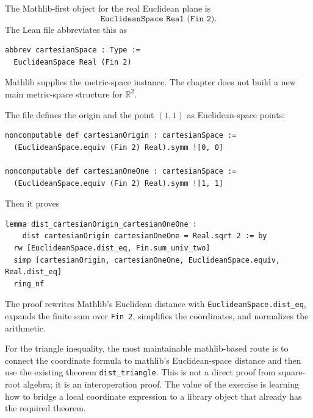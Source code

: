 \begin{example*}
The Mathlib-first object for the real Euclidean plane is
\[
  \texttt{EuclideanSpace Real (Fin 2)}.
\]
The Lean file abbreviates this as
\begin{verbatim}
abbrev cartesianSpace : Type :=
  EuclideanSpace Real (Fin 2)
\end{verbatim}
Mathlib supplies the metric-space instance. The chapter does not build a new
main metric-space structure for \(\mathbb{R}^2\).
\end{example*}

\begin{example*}
The file defines the origin and the point \((1,1)\) as Euclidean-space points:
\begin{verbatim}
noncomputable def cartesianOrigin : cartesianSpace :=
  (EuclideanSpace.equiv (Fin 2) Real).symm ![0, 0]

noncomputable def cartesianOneOne : cartesianSpace :=
  (EuclideanSpace.equiv (Fin 2) Real).symm ![1, 1]
\end{verbatim}
Then it proves
\begin{verbatim}
lemma dist_cartesianOrigin_cartesianOneOne :
    dist cartesianOrigin cartesianOneOne = Real.sqrt 2 := by
  rw [EuclideanSpace.dist_eq, Fin.sum_univ_two]
  simp [cartesianOrigin, cartesianOneOne, EuclideanSpace.equiv, Real.dist_eq]
  ring_nf
\end{verbatim}
The proof rewrites Mathlib's Euclidean distance with
\texttt{EuclideanSpace.dist\_eq}, expands the finite sum over
\texttt{Fin 2}, simplifies the coordinates, and normalizes the arithmetic.
\end{example*}

\begin{remark*}
For the triangle inequality, the most maintainable mathlib-based route is to
connect the coordinate formula to mathlib's Euclidean-space distance and then
use the existing theorem \texttt{dist\_triangle}. This is not a direct proof
from square-root algebra; it is an interoperation proof. The value of the
exercise is learning how to bridge a local coordinate expression to a library
object that already has the required theorem.
\end{remark*}

